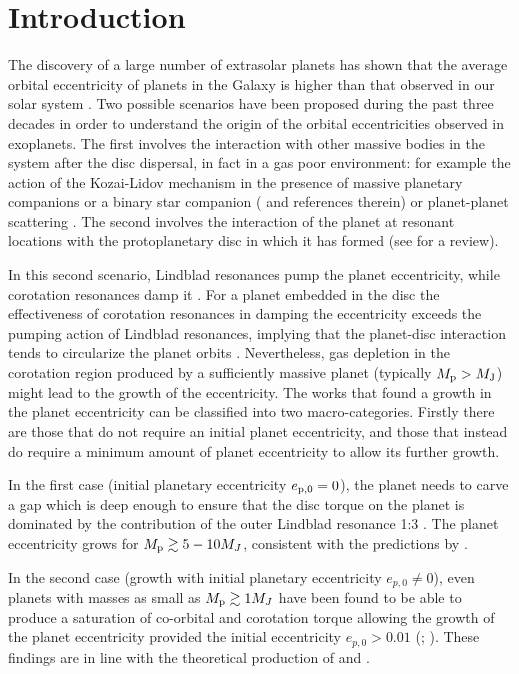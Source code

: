 \documentclass[usenatbib,a4paper,times,fleqn]{mnras}
\begin{document}
\section{Introduction}
\label{intro}
The discovery of a large number of extrasolar planets has shown that the average orbital eccentricity of planets in the Galaxy is higher than that observed in our solar system \citep{butler2006}. Two possible scenarios have been proposed during the past three decades in order to understand the origin of the orbital eccentricities observed in exoplanets. The first involves the interaction with other massive bodies in the system after the disc dispersal, in fact in a gas poor environment: for example the action of the Kozai-Lidov mechanism in the presence of massive planetary companions or a binary star companion (\citealp{naoz2016} and references therein) or planet-planet scattering \citep{ford1996,papaloizouTerq2001,ford2008,juric2008,mustill2017}.
The second involves the interaction of the planet at resonant locations with the protoplanetary disc in which it has formed (see \citealp{kley2012Rev} for a review).

In this second scenario, Lindblad resonances pump the planet eccentricity, while corotation resonances damp it \citep{goldreich1980}. For a planet embedded in the disc the effectiveness of corotation resonances in damping the eccentricity exceeds the pumping action of Lindblad resonances, implying that the planet-disc interaction tends to circularize the planet orbits \citep{cresswell2007,bitsch2010}. Nevertheless, gas depletion in the corotation region produced by a sufficiently massive planet (typically $M_{\rm p}> M_{\rm J}$) might lead to the growth of the eccentricity. The works that found a growth in the planet eccentricity can be classified into two macro-categories. Firstly there are those that do not require an initial planet eccentricity, and those that instead do require a minimum amount of planet eccentricity to allow its further growth. 

In the first case (initial planetary eccentricity $e_{{\rm p},0}=0$), the planet needs to carve a gap which is deep enough to ensure that the disc torque on the planet is dominated by the contribution of the outer Lindblad resonance 1:3 \citep{papaloizou2001,dunhill2013,bitsch2013}. The planet eccentricity grows for $M_{\rm p}\gtrsim 5-10 M_J$, consistent with the predictions by \citet{lubow1991}.

In the second case (growth with initial planetary eccentricity $e_{p,0}\neq 0$), even planets with masses as small as $M_{\rm p}\gtrsim 1M_J$ have been found to be able to produce a saturation of co-orbital and corotation torque allowing the growth of the planet eccentricity provided the initial eccentricity $e_{p,0}>0.01$ (\citealp{dangelo2006}; \citealp{duffell2015}). These findings are in line with the theoretical production of \citet{ogilvie2003} and \citet{goldreich2003}. 
\end{document}
